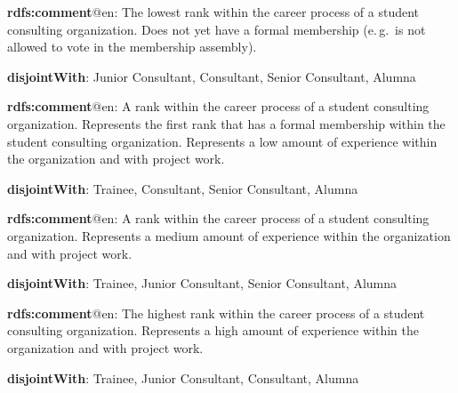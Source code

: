 \documentclass[a4paper, DIV=13, BCOR=0cm]{scrbook}
\newcommand{\eg}{e.\,g.\ }
\begin{document}
\begin{mdframed}[style=onto-3, frametitle={Trainee}]
	{%
		\begin{compactitem}
			\item \textbf{rdfs:comment}@en: The lowest rank within the career 
			process of a student consulting organization. Does not yet have a 
			formal membership (\eg is not allowed to vote in the membership 
			assembly).
			\item \textbf{disjointWith}: Junior Consultant, Consultant, Senior 
			Consultant, Alumna
		\end{compactitem}
	} %
\end{mdframed}

\begin{mdframed}[style=onto-3, frametitle={Junior Consultant}]
	{%
		\begin{compactitem}
			\item \textbf{rdfs:comment}@en: A rank within the career process of 
			a student consulting organization. Represents the first rank that has a 
			formal membership within the student consulting organization. 
			Represents a low amount of experience within the organization and 
			with project work.
			\item \textbf{disjointWith}: Trainee, Consultant, Senior Consultant, 
			Alumna
		\end{compactitem}
	} %
\end{mdframed}

\begin{mdframed}[style=onto-3, frametitle={Consultant}]
	{%
		\begin{compactitem}
			\item \textbf{rdfs:comment}@en: A rank within the career process of 
			a student consulting organization. Represents a medium amount of 
			experience within the organization and with project work.
			\item \textbf{disjointWith}: Trainee, Junior Consultant, Senior 
			Consultant, Alumna
		\end{compactitem}
	} %
\end{mdframed}

\begin{mdframed}[style=onto-3, frametitle={Senior Consultant}]
	{%
		\begin{compactitem}
			\item \textbf{rdfs:comment}@en: The highest rank within the career 
			process of a student consulting organization. Represents a high 
			amount of experience within the organization and with project work.
			\item \textbf{disjointWith}: Trainee, Junior Consultant, Consultant, 
			Alumna
		\end{compactitem}
	} %
\end{mdframed}
\end{document}
